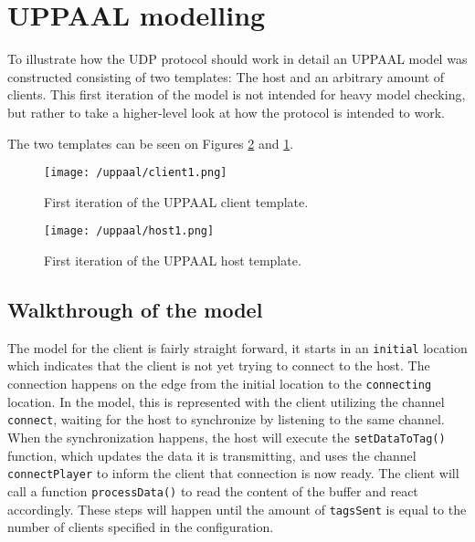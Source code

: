\section{UPPAAL modelling}
To illustrate how the UDP protocol should work in detail an UPPAAL model was constructed consisting of two templates: The host and an arbitrary amount of clients.
This first iteration of the model is not intended for heavy model checking, but rather to take a higher-level look at how the protocol is intended to work.

The two templates can be seen on Figures \ref{fig:uppaal-host-1} and \ref{fig:uppaal-client-1}.

\begin{figure}[H]
   \centering
    \texttt{[image: /uppaal/client1.png]}
    \caption{First iteration of the UPPAAL client template.}
    \label{fig:uppaal-client-1}
\end{figure}

\begin{figure}[H]
   \centering
    \texttt{[image: /uppaal/host1.png]}
    \caption{First iteration of the UPPAAL host template.}
    \label{fig:uppaal-host-1}
\end{figure}

\subsection{Walkthrough of the model}
The model for the client is fairly straight forward, it starts in an \texttt{initial} location which indicates that the client is not yet trying to connect to the host.
The connection happens on the edge from the initial location to the \texttt{connecting} location.
In the model, this is represented with the client utilizing the channel \texttt{connect}, waiting for the host to synchronize by listening to the same channel.
When the synchronization happens, the host will execute the \texttt{setDataToTag()} function, which updates the data it is transmitting, and uses the channel \texttt{connectPlayer} to inform the client that connection is now ready.
The client will call a function \texttt{processData()} to read the content of the buffer and react accordingly. 
These steps will happen until the amount of \texttt{tagsSent} is equal to the number of clients specified in the configuration.

